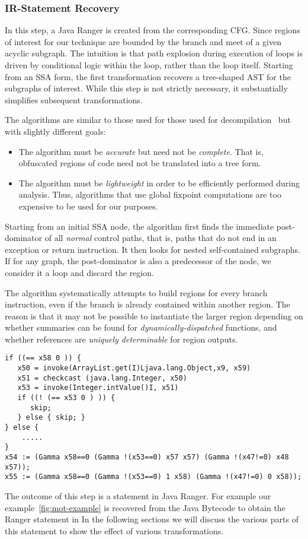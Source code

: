 \subsubsection{IR-Statement Recovery}
In this step, a Java Ranger is created from the corresponding CFG. Since regions of interest for our technique are bounded by the branch and meet of a given acyclic subgraph.  The intuition is that path explosion during execution of loops is driven by conditional logic within the loop, rather than the loop itself.
Starting from an SSA form, the first transformation recovers a tree-shaped AST for the subgraphs of interest.  While this step is not strictly necessary, it substantially simplifies subsequent transformations.  

The algorithms are similar to those used for those used for decompilation~\cite{Yakdan15@decompilation} but with slightly different goals: 
\begin{itemize}
    \item The algorithm must be {\em accurate} but need not be {\em complete}.  That is, obfuscated regions of code need not be translated into a tree form.
    \item The algorithm must be {\em lightweight} in order to be efficiently performed during analysis.  Thus, algorithms that use global fixpoint computations are 
        too expensive to be used for our purposes.
\end{itemize}

Starting from an initial SSA node, the algorithm first finds the immediate post-dominator of all {\em normal} control paths, that is, paths that do not end in an exception or return instruction.  It then looks for nested self-contained subgraphs.  If for any graph, the post-dominator is also a predecessor of the node, we consider it a loop and discard the region.  

The algorithm systematically attempts to build regions for every branch instruction, even if the branch is already contained within another region.  The reason is that it may not be possible to instantiate the larger region depending on whether summaries can be found for {\em dynamically-dispatched} functions, and whether references are {\em uniquely determinable} for region outputs.

\begin{lstlisting}
if ((== x58 0 )) {
   x50 = invoke(ArrayList.get(I)Ljava.lang.Object,x9, x59)
   x51 = checkcast (java.lang.Integer, x50)
   x53 = invoke(Integer.intValue()I, x51)
   if ((! (== x53 0 ) )) {
      skip;
   } else { skip; }
} else {
	.....
}
x54 := (Gamma x58==0 (Gamma !(x53==0) x57 x57) (Gamma !(x47!=0) x48 x57));
x55 := (Gamma x58==0 (Gamma !(x53==0) 1 x58) (Gamma !(x47!=0) 0 x58));
\end{lstlisting}
The outcome of this step is a statement in Java Ranger. For example our example~\ref{fig:mot-example} is recovered from the Java Bytecode to obtain the Ranger statement in
In the following sections we will discuss the various parts of this statement to show the effect of various transformations. 

